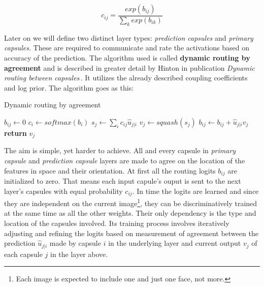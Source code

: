 \begin{equation}
    c_{ij} = \frac{exp(b_{ij})}{\sum_{k}exp(b_{ik})}
    \label{eq:softmax}
\end{equation}

Later on we will define two distinct layer types: \textit{prediction capsules} and \textit{primary capsules}. These are required to communicate and rate the activations based on accuracy of the prediction. The algorithm used is called \textbf{dynamic routing by agreement} and is described in greater detail by Hinton in publication \textit{Dynamic routing between capsules}\,\cite{capsule}. It utilizes the already described coupling coefficients and log prior. The algorithm goes as this:

\begin{algorithm}[H]
    \caption{Dynamic routing by agreement}\label{alg:routing}
    \begin{algorithmic}[1]
         $b_{ij}\gets 0$ \EndFor
             $c_{i}\gets softmax(b_i)$ \EndFor
             $s_{j}\gets \sum_ic_{ij}\hat{u}_{j|i}$ \EndFor
             $v_{j}\gets squash(s_j)$ \EndFor
             $b_{ij}\gets b_{ij} + \hat{u}_{j|i} v_j$ \EndFor
        \EndFor
        \State \textbf{return} $v_j$
    \EndProcedure
    \end{algorithmic}
\end{algorithm}

The aim is simple, yet harder to achieve. All and every capsule in \textit{primary capsule} and \textit{prediction capsule} layers are made to agree on the location of the features in space and their orientation. At first all the routing logits $b_{ij}$ are initialized to zero. That means each input capule's ouput is sent to the next layer's capsules with equal probability $c_{ij}$. In time the logits are learned and since they are independent on the current image\footnote{Each image is expected to include one and just one face, not more.}, they can be discriminatively trained at the same time as all the other weights. Their only dependency is the type and location of the capsules involved. Its training process involves iteratively adjusting and refining the logits based on measurement of agreement between the prediction $\hat{u}_{j|i}$ made by capsule $i$ in the underlying layer and current output $v_j$ of each capsule $j$ in the layer above.

